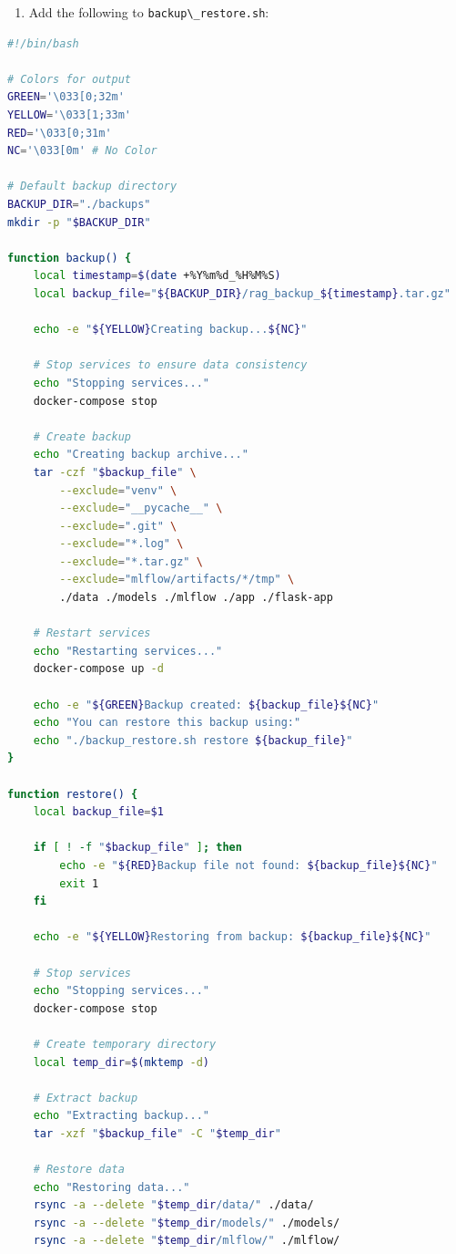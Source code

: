 \documentclass[
  screen,review,acmlarge]{acmart}
\newcommand{\passthrough}[1]{#1}
\providecommand{\tightlist}{%
  \setlength{\itemsep}{0pt}\setlength{\parskip}{0pt}}
\begin{document}
\begin{enumerate}
\def\labelenumi{\arabic{enumi}.}
\setcounter{enumi}{3}
\tightlist
\item
  Add the following to \passthrough{\lstinline!backup\_restore.sh!}:
\end{enumerate}

\begin{lstlisting}[language=bash]
#!/bin/bash

# Colors for output
GREEN='\033[0;32m'
YELLOW='\033[1;33m'
RED='\033[0;31m'
NC='\033[0m' # No Color

# Default backup directory
BACKUP_DIR="./backups"
mkdir -p "$BACKUP_DIR"

function backup() {
    local timestamp=$(date +%Y%m%d_%H%M%S)
    local backup_file="${BACKUP_DIR}/rag_backup_${timestamp}.tar.gz"
    
    echo -e "${YELLOW}Creating backup...${NC}"
    
    # Stop services to ensure data consistency
    echo "Stopping services..."
    docker-compose stop
    
    # Create backup
    echo "Creating backup archive..."
    tar -czf "$backup_file" \
        --exclude="venv" \
        --exclude="__pycache__" \
        --exclude=".git" \
        --exclude="*.log" \
        --exclude="*.tar.gz" \
        --exclude="mlflow/artifacts/*/tmp" \
        ./data ./models ./mlflow ./app ./flask-app
    
    # Restart services
    echo "Restarting services..."
    docker-compose up -d
    
    echo -e "${GREEN}Backup created: ${backup_file}${NC}"
    echo "You can restore this backup using:"
    echo "./backup_restore.sh restore ${backup_file}"
}

function restore() {
    local backup_file=$1
    
    if [ ! -f "$backup_file" ]; then
        echo -e "${RED}Backup file not found: ${backup_file}${NC}"
        exit 1
    fi
    
    echo -e "${YELLOW}Restoring from backup: ${backup_file}${NC}"
    
    # Stop services
    echo "Stopping services..."
    docker-compose stop
    
    # Create temporary directory
    local temp_dir=$(mktemp -d)
    
    # Extract backup
    echo "Extracting backup..."
    tar -xzf "$backup_file" -C "$temp_dir"
    
    # Restore data
    echo "Restoring data..."
    rsync -a --delete "$temp_dir/data/" ./data/
    rsync -a --delete "$temp_dir/models/" ./models/
    rsync -a --delete "$temp_dir/mlflow/" ./mlflow/
    

\end{lstlisting}
\end{document}
